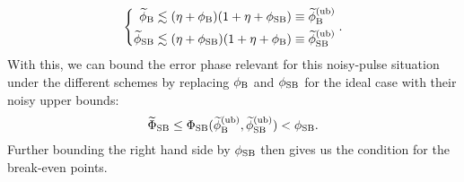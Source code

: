 \documentclass[pra,reprint,superscriptaddress]{revtex4-2}
\begin{document}
\begin{equation}\label{eq:comb-bound}
\left\{
\begin{aligned}
 \widetilde\phi_{\mathrm{B}} &\lesssim (\eta + \phi_{\mathrm{B}})(1+\eta + \phi_{\mathrm{SB}}) \equiv \widetilde\phi_{\mathrm{B}}^{(\mathrm{ub})}\\
 \widetilde\phi_{\mathrm{SB}} &\lesssim (\eta + \phi_{\mathrm{SB}}) (1+\eta + \phi_{\mathrm{B}})\equiv \widetilde\phi_{\mathrm{SB}}^{(\mathrm{ub})}
\end{aligned}
\right..
\end{equation}
With this, we can bound the error phase relevant for this noisy-pulse situation under the different schemes by replacing $\phi_{\mathrm{B}}$ and $\phi_{\mathrm{SB}}$ for the ideal case with their noisy upper bounds: 
\begin{equation}
 \widetilde\Phi_{\mathrm{SB}} \le \Phi_{\mathrm{SB}}(\widetilde\phi_{\mathrm{B}}^{(\mathrm{ub})}  ,\widetilde\phi_{\mathrm{SB}}^{(\mathrm{ub})} ) < \phi_{\mathrm{SB}}.
\end{equation}
Further bounding the right hand side by $\phi_{\mathrm{SB}}$ then gives us the condition for the break-even points.
\end{document}
